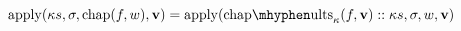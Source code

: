 \documentclass{sigplanconf}
\begin{document}
$\mathrm{apply}(\kappa s,\sigma,\mathrm{chap}(f,w),\mathbf{v})=\mathrm{apply}(\mathrm{chap\mhyphen ults}_\kappa(f,\mathbf{v})::\kappa s,\sigma,w,\mathbf{v})$






\end{document}
